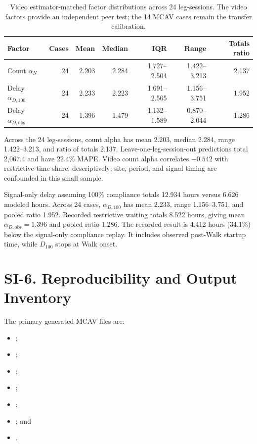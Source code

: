 \documentclass[11pt]{article}
\begin{document}
\begin{table}[htbp]
\centering
\caption{Video estimator-matched factor distributions across 24 leg-sessions. The video factors provide an independent peer test; the 14 MCAV cases remain the transfer calibration.}
\label{tab:video-alpha-summary}
\footnotesize
\setlength{\tabcolsep}{5pt}
\begin{tabular}{@{}lrrrrrr@{}}
\toprule
Factor & Cases & Mean & Median & IQR & Range & Totals ratio \\
\midrule
Count \(\alpha_N\) & 24 & 2.203 & 2.284 & 1.727--2.504 & 1.422--3.213 & 2.137 \\
Delay \(\alpha_{D,100}\) & 24 & 2.233 & 2.223 & 1.691--2.565 & 1.156--3.751 & 1.952 \\
Delay \(\alpha_{D,\mathrm{obs}}\) & 24 & 1.396 & 1.479 & 1.132--1.589 & 0.870--2.044 & 1.286 \\
\bottomrule
\end{tabular}
\end{table}

Across the 24 leg-sessions, count alpha has mean 2.203, median 2.284, range 1.422--3.213, and ratio of totals 2.137. Leave-one-leg-session-out predictions total 2,067.4 and have 22.4\% MAPE. Video count alpha correlates \(-0.542\) with restrictive-time share, descriptively; site, period, and signal timing are confounded in this small sample.

Signal-only delay assuming 100\% compliance totals 12.934 hours versus 6.626 modeled hours. Across 24 cases, \(\alpha_{D,100}\) has mean 2.233, range 1.156--3.751, and pooled ratio 1.952. Recorded restrictive waiting totals 8.522 hours, giving mean \(\alpha_{D,\mathrm{obs}}=1.396\) and pooled ratio 1.286. The recorded result is 4.412 hours (34.1\%) below the signal-only compliance replay. It includes observed post-Walk startup time, while \(D_{100}\) stops at Walk onset.

\section*{SI-6. Reproducibility and Output Inventory}

The primary generated MCAV files are:
\begin{itemize}
  \item {};
  \item {};
  \item {};
  \item {};
  \item {};
  \item {}; and
  \item {}.
\end{itemize}
\end{document}
